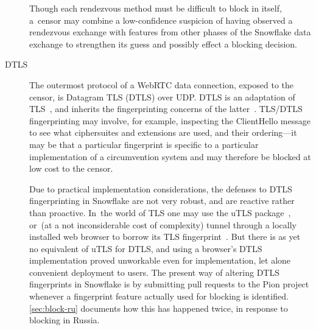 \documentclass[letterpaper,twocolumn]{article}
\begin{document}
\begin{description}
Though each rendezvous method must be difficult to block in itself,
a~censor may combine a low-confidence suspicion of having observed a rendezvous exchange
with features from other phases of the Snowflake data exchange
to strengthen its guess and possibly effect a blocking decision.

\item[DTLS]
The outermost protocol
of a WebRTC data connection, exposed to the censor,
is Datagram TLS (DTLS) over UDP.
DTLS is an adaptation of TLS~\cite[\S 1]{rfc9147},
and inherits the fingerprinting concerns of the latter~\cite{Frolov2019a}.
TLS/DTLS fingerprinting may involve, for example,
inspecting the ClientHello message to see what
ciphersuites and extensions are used,
and their ordering---it may be that a particular fingerprint
is specific to a particular implementation of a circumvention system
and may therefore be blocked at low cost to the censor.

Due to practical implementation considerations,
the defenses to DTLS fingerprinting in Snowflake are not very robust,
and are reactive rather than proactive.
In~the world of TLS one may use the uTLS package~\cite[\S VII]{Frolov2019a},
or~(at a not inconsiderable cost of complexity)
tunnel through a locally installed web browser
to borrow its TLS fingerprint~\cite[\S 5.1]{Fifield2015a}.
But there is as yet no equivalent of uTLS for DTLS,
and using a browser's DTLS implementation proved unworkable
even for implementation, let alone convenient deployment to users.
The present way of altering DTLS fingerprints in Snowflake
is by submitting pull requests to the Pion project
whenever a fingerprint feature actually used for blocking is identified.
\autoref{sec:block-ru} documents how this has happened twice,
in response to blocking in Russia.

%


\end{description}
\end{document}
